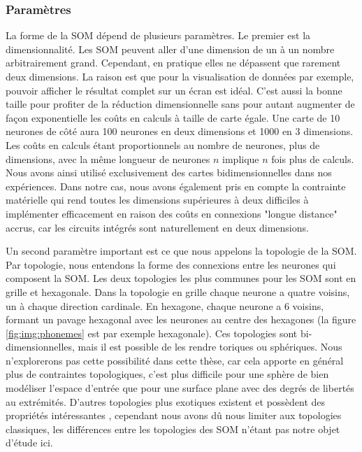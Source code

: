 \subsubsection{Paramètres}\label{param_som}

	La forme de la SOM dépend de plusieurs paramètres. Le premier est la dimensionnalité. Les SOM peuvent aller d'une dimension de un à un nombre arbitrairement grand. Cependant, en pratique elles ne dépassent que rarement deux dimensions. La raison est que pour la visualisation de données par exemple, pouvoir afficher le résultat complet sur un écran est idéal. C'est aussi la bonne taille pour profiter de la réduction dimensionnelle sans pour autant augmenter de façon exponentielle les coûts en calculs à taille de carte égale. Une carte de 10 neurones de côté aura 100 neurones en deux dimensions et 1000 en 3 dimensions. Les coûts en calculs étant proportionnels au nombre de neurones, plus de dimensions, avec la même longueur de neurones $n$ implique $n$ fois plus de calculs. Nous avons ainsi utilisé exclusivement des cartes bidimensionnelles dans nos expériences. Dans notre cas, nous avons également pris en compte la contrainte matérielle qui rend toutes les dimensions supérieures à deux difficiles à implémenter efficacement en raison des coûts en connexions "longue distance" accrus, car les circuits intégrés sont naturellement en deux dimensions.
	
	Un second paramètre important est ce que nous appelons la topologie de la SOM. Par topologie, nous entendons la forme des connexions entre les neurones qui composent la SOM. Les deux topologies les plus communes pour les SOM sont en grille et hexagonale. Dans la topologie en grille chaque neurone a quatre voisins, un à chaque direction cardinale. En hexagone, chaque neurone a 6 voisins, formant un pavage hexagonal avec les neurones au centre des hexagones (la figure \ref{fig:img:phonemes} est par exemple hexagonale). Ces topologies sont bi-dimensionnelles, mais il est possible de les rendre toriques ou sphériques. Nous n'explorerons pas cette possibilité dans cette thèse, car cela apporte en général plus de contraintes topologiques, c'est plus difficile pour une sphère de bien modéliser l'espace d'entrée que pour une surface plane avec des degrés de libertés au extrémités. D'autres topologies plus exotiques existent et possèdent des propriétés intéressantes \cite{bernard2018np}, cependant nous avons dû nous limiter aux topologies classiques, les différences entre les topologies des SOM n'étant pas notre objet d'étude ici.


